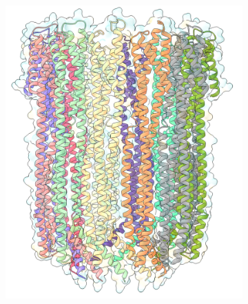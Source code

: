 \begin{figure}[ht]
  \begin{centering}
  \begin{subfigure}[t]{\dimexpr.3\linewidth-1.3em\relax}
  \centering
  \includegraphics[width=\linewidth,valign=t]{Figures/clya-front-c.png}
  \end{subfigure}%
  \begin{subfigure}[t]{\dimexpr.3\linewidth-1.3em\relax}
  \centering

\end{subfigure}
\end{centering}
\end{figure}
